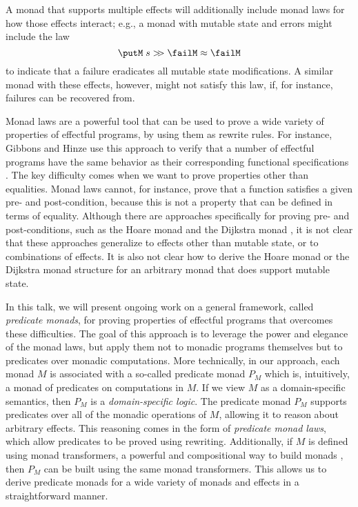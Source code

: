 \documentclass[preprint]{sigplanconf}
\begin{document}
A monad that supports multiple effects will additionally include monad laws for
how those effects interact; e.g., a monad with mutable state and errors might
include the law
\[
\putM\;s \bindU \failM \lreq \failM
\]
to indicate that a failure eradicates all mutable state modifications.  A
similar monad with these effects, however, might not satisfy this law, if, for
instance, failures can be recovered from.


Monad laws are a powerful tool that can be used to prove a wide variety of
properties of effectful programs, by using them as rewrite rules. For instance,
Gibbons and Hinze use this approach to verify that a number of effectful
programs have the same behavior as their corresponding functional specifications
\cite{gibbons11}.
%
The key difficulty comes when we want to prove properties other than equalities.
Monad laws cannot, for instance, prove that a function satisfies a given pre-
and post-condition, because this is not a property that can be defined in terms
of equality. Although there are approaches specifically for proving pre- and
post-conditions, such as the Hoare monad \cite{nanevski08} and the Dijkstra
monad \cite{swamy13}, it is not clear that these approaches generalize to
effects other than mutable state, or to combinations of effects.
It is also not clear how to derive the Hoare monad or the Dijkstra monad
structure for an arbitrary monad that does support mutable state.


In this talk, we will present ongoing work on a general framework, called
\emph{predicate monads}, for proving properties of effectful programs that
overcomes these difficulties. The goal of this approach is to leverage the power
and elegance of the monad laws, but apply them not to monadic programs
themselves but to predicates over monadic computations.  More technically, in
our approach, each monad $M$ is associated with a so-called predicate monad $P_M$
which is, intuitively, a monad of predicates on computations in $M$.
If we view $M$ as a domain-specific semantics, then $P_M$ is a
\emph{domain-specific logic}.
The predicate monad $P_M$ supports predicates over all of the monadic operations
of $M$, allowing it to reason about arbitrary effects. This reasoning comes in
the form of \emph{predicate monad laws}, which allow predicates to be proved
using rewriting. Additionally, if $M$ is defined using monad transformers, a
powerful and compositional way to build monads \cite{liang95}, then $P_M$ can be
built using the same monad transformers. This allows us to derive predicate
monads for a wide variety of monads and effects in a straightforward manner.
\end{document}
